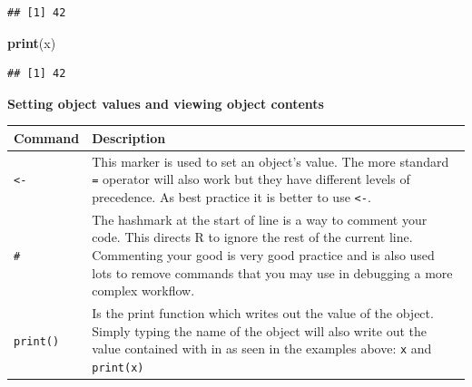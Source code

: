 \documentclass[a4paper]{book}
\newenvironment{Shaded}{\begin{snugshade}}{\end{snugshade}}
\newcommand{\KeywordTok}[1]{\textcolor[rgb]{0.13,0.29,0.53}{\textbf{{#1}}}}
\newcommand{\NormalTok}[1]{{#1}}
\renewenvironment{Shaded}
{\vspace{1.5em}\begin{leftbar}\begin{snugshade}}
{\end{snugshade}\end{leftbar}\vspace{3pt}}
\begin{document}
\begin{verbatim}
## [1] 42
\end{verbatim}

\begin{Shaded}
\begin{Highlighting}[]
\KeywordTok{print}\NormalTok{(x)}
\end{Highlighting}
\end{Shaded}

\begin{verbatim}
## [1] 42
\end{verbatim}

\textbf{Setting object values and viewing object contents}

\begin{longtable}[]{@{}ll@{}}
\toprule
\begin{minipage}[b]{0.13\columnwidth}\raggedright\strut
Command\strut
\end{minipage} & \begin{minipage}[b]{0.81\columnwidth}\raggedright\strut
Description\strut
\end{minipage}\tabularnewline
\midrule
\endhead
\begin{minipage}[t]{0.13\columnwidth}\raggedright\strut
\texttt{\textless{}-}\strut
\end{minipage} & \begin{minipage}[t]{0.81\columnwidth}\raggedright\strut
This marker is used to set an object's value. The more standard
\texttt{=} operator will also work but they have different levels of
precedence. As best practice it is better to use
\texttt{\textless{}-}.\strut
\end{minipage}\tabularnewline
\begin{minipage}[t]{0.13\columnwidth}\raggedright\strut
\texttt{\#}\strut
\end{minipage} & \begin{minipage}[t]{0.81\columnwidth}\raggedright\strut
The hashmark at the start of line is a way to comment your code. This
directs R to ignore the rest of the current line. Commenting your good
is very good practice and is also used lots to remove commands that you
may use in debugging a more complex workflow.\strut
\end{minipage}\tabularnewline
\begin{minipage}[t]{0.13\columnwidth}\raggedright\strut
\texttt{print()}\strut
\end{minipage} & \begin{minipage}[t]{0.81\columnwidth}\raggedright\strut
Is the print function which writes out the value of the object. Simply
typing the name of the object will also write out the value contained
with in as seen in the examples above: \texttt{x} and
\texttt{print(x)}\strut
\end{minipage}\tabularnewline
\bottomrule
\end{longtable}
\end{document}
